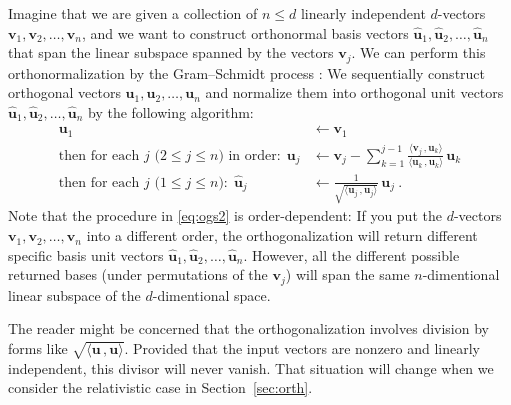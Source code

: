 \documentclass{article}
\newcommand{\Evec}[1]{{\mathbf{#1}}} %
\newcommand{\Ehat}[1]{{\mathbf{\hat{#1}}}} %
\newcommand{\inner}[2]{\langle{#1}\,,{#2}\rangle}
\newcommand{\secref}[1]{Section~\ref{#1}}
\begin{document}
Imagine that we are given a collection of $n\leq d$ linearly independent $d$-vectors $\Evec{v}_1,\Evec{v}_2,\ldots,\Evec{v}_n$,
and we want to construct orthonormal basis vectors $\Ehat{u}_1,\Ehat{u}_2,\ldots,\Ehat{u}_n$ that span the linear subspace spanned by the vectors $\Evec{v}_j$.
We can perform this orthonormalization by the Gram--Schmidt process \cite{gramschmidt}:
We sequentially construct orthogonal vectors $\Evec{u}_1,\Evec{u}_2,\ldots,\Evec{u}_n$ and normalize them into orthogonal unit vectors $\Ehat{u}_1,\Ehat{u}_2,\ldots,\Ehat{u}_n$ by the following algorithm:
\begin{align}
    \Evec{u}_1 &\leftarrow \Evec{v}_1 \label{eq:ogs1}
    \\
    \mbox{then for each $j$ ($2\leq j\leq n$) in order:} ~~ \Evec{u}_j &\leftarrow \Evec{v}_j - \sum_{k=1}^{j-1} \frac{\inner{\Evec{v}_j}{\Evec{u}_k}}{\inner{\Evec{u}_k}{\Evec{u}_k}}\,\Evec{u}_k \label{eq:ogs2}
    \\
    \mbox{then for each $j$ ($1\leq j\leq n$):} ~~ \Ehat{u}_j &\leftarrow \frac{1}{\sqrt{\inner{\Evec{u}_j}{\Evec{u}_j}}}\,\Evec{u}_j ~. \label{eq:ogs3}
\end{align}
Note that the procedure in \eqref{eq:ogs2} is order-dependent: If you put the $d$-vectors $\Evec{v}_1,\Evec{v}_2,\ldots,\Evec{v}_n$ into a different order, the orthogonalization will return different specific basis unit vectors $\Ehat{u}_1,\Ehat{u}_2,\ldots,\Ehat{u}_n$.
However, all the different possible returned bases (under permutations of the $\Evec{v}_j$) will span the same $n$-dimentional linear subspace of the $d$-dimentional space.

The reader might be concerned that the orthogonalization involves division by forms like $\sqrt{\inner{\Evec{u}}{\Evec{u}}}$.
Provided that the input vectors are nonzero and linearly independent, this divisor will never vanish.
That situation will change when we consider the relativistic case in \secref{sec:orth}.
\end{document}
